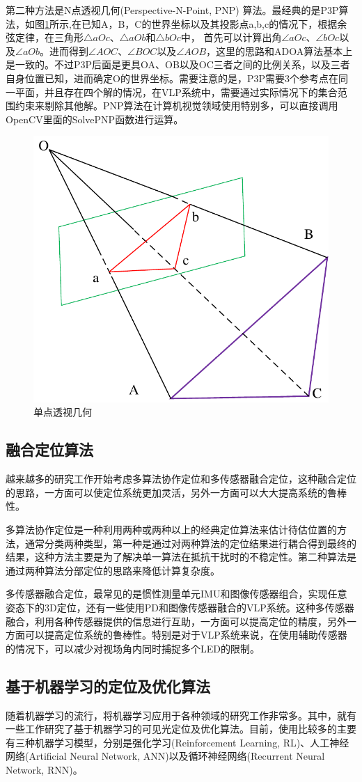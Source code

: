   第二种方法是N点透视几何(Perspective-N-Point, PNP) 算法。最经典的是P3P算法，如图\ref{fig:PNP}所示,在已知A，B，C的世界坐标以及其投影点a,b,c的情况下，根据余弦定律，在三角形$\triangle aOc$、$\triangle aOb$和$\triangle bOc$中， 首先可以计算出角$\angle aOc$、$\angle bOc$以及$\angle aOb$。进而得到$\angle AOC$、$\angle BOC$以及$\angle AOB$，这里的思路和ADOA算法基本上是一致的。不过P3P后面是更具OA、OB以及OC三者之间的比例关系，以及三者自身位置已知，进而确定O的世界坐标。需要注意的是，P3P需要3个参考点在同一平面，并且存在四个解的情况，在VLP系统中，需要通过实际情况下的集合范围约束来剔除其他解。PNP算法在计算机视觉领域使用特别多，可以直接调用OpenCV里面的SolvePNP函数进行运算。
\begin{figure}[!t]
  \centering
  \includegraphics[width=0.4\linewidth]{FIG/PNP.pdf}
  \caption{单点透视几何}
  \label{fig:PNP}
\end{figure}


\subsection{融合定位算法}
越来越多的研究工作开始考虑多算法协作定位和多传感器融合定位，这种融合定位的思路，一方面可以使定位系统更加灵活，另外一方面可以大大提高系统的鲁棒性。

多算法协作定位是一种利用两种或两种以上的经典定位算法来估计待估位置的方法，通常分类两种类型，第一种是通过对两种算法的定位结果进行耦合得到最终的结果，这种方法主要是为了解决单一算法在抵抗干扰时的不稳定性。第二种算法是通过两种算法分部定位的思路来降低计算复杂度。

多传感器融合定位，最常见的是惯性测量单元IMU和图像传感器组合，实现任意姿态下的3D定位，还有一些使用PD和图像传感器融合的VLP系统。这种多传感器融合，利用各种传感器提供的信息进行互助，一方面可以提高定位的精度，另外一方面可以提高定位系统的鲁棒性。特别是对于VLP系统来说，在使用辅助传感器的情况下，可以减少对视场角内同时捕捉多个LED的限制。


\subsection{基于机器学习的定位及优化算法}
随着机器学习的流行，将机器学习应用于各种领域的研究工作非常多。其中，就有一些工作研究了基于机器学习的可见光定位及优化算法。目前，使用比较多的主要有三种机器学习模型，分别是强化学习(Reinforcement Learning, RL)、人工神经网络(Artificial Neural Network, ANN)以及循环神经网络(Recurrent Neural Network, RNN)。

